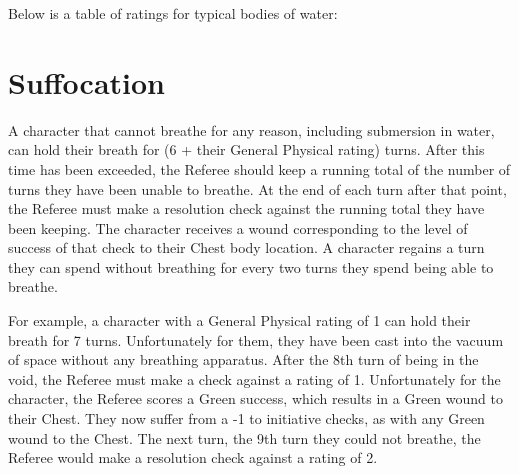 \documentclass[oneside]{book}
\begin{document}
\begin{multicols}{2}
Below is a table of ratings for typical bodies of water:

\begin{center}
\end{center}


\section{Suffocation}

A character that cannot breathe for any reason, including submersion in water, can hold their breath for (6 + their General Physical rating) turns. After this time has been exceeded, the Referee should keep a running total of the number of turns they have been unable to breathe. At the end of each turn after that point, the Referee must make a resolution check against the running total they have been keeping. The character receives a wound corresponding to the level of success of that check to their Chest body location. A character regains a turn they can spend without breathing for every two turns they spend being able to breathe. 

For example, a character with a General Physical rating of 1 can hold their breath for 7 turns. Unfortunately for them, they have been cast into the vacuum of space without any breathing apparatus. After the 8th turn of being in the void, the Referee must make a check against a rating of 1. Unfortunately for the character, the Referee scores a Green success, which results in a Green wound to their Chest. They now suffer from a -1 to initiative checks, as with any Green wound to the Chest. The next turn, the 9th turn they could not breathe, the Referee would make a resolution check against a rating of 2.



\end{multicols}
\end{document}
